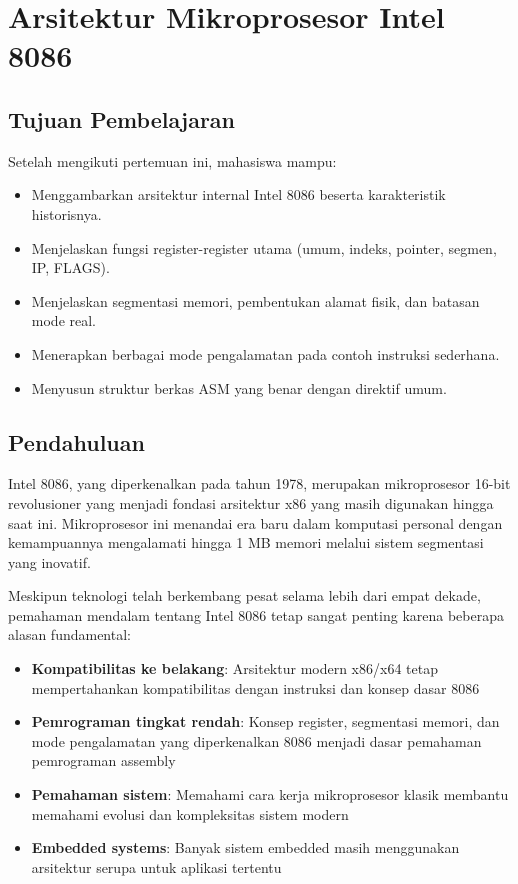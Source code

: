 \documentclass[../main.tex]{subfiles}
\begin{document}
\chapter{Arsitektur Mikroprosesor Intel 8086}

\section{Tujuan Pembelajaran}
Setelah mengikuti pertemuan ini, mahasiswa mampu:
\begin{itemize}
    \item Menggambarkan arsitektur internal Intel 8086 beserta karakteristik historisnya.
    \item Menjelaskan fungsi register-register utama (umum, indeks, pointer, segmen, IP, FLAGS).
    \item Menjelaskan segmentasi memori, pembentukan alamat fisik, dan batasan mode real.
    \item Menerapkan berbagai mode pengalamatan pada contoh instruksi sederhana.
    \item Menyusun struktur berkas ASM yang benar dengan direktif umum.
\end{itemize}

\section{Pendahuluan}
Intel 8086, yang diperkenalkan pada tahun 1978, merupakan mikroprosesor 16-bit revolusioner yang menjadi fondasi arsitektur x86 yang masih digunakan hingga saat ini. Mikroprosesor ini menandai era baru dalam komputasi personal dengan kemampuannya mengalamati hingga 1 MB memori melalui sistem segmentasi yang inovatif. 

Meskipun teknologi telah berkembang pesat selama lebih dari empat dekade, pemahaman mendalam tentang Intel 8086 tetap sangat penting karena beberapa alasan fundamental:

\begin{itemize}
    \item \textbf{Kompatibilitas ke belakang}: Arsitektur modern x86/x64 tetap mempertahankan kompatibilitas dengan instruksi dan konsep dasar 8086
    \item \textbf{Pemrograman tingkat rendah}: Konsep register, segmentasi memori, dan mode pengalamatan yang diperkenalkan 8086 menjadi dasar pemahaman pemrograman assembly
    \item \textbf{Pemahaman sistem}: Memahami cara kerja mikroprosesor klasik membantu memahami evolusi dan kompleksitas sistem modern
    \item \textbf{Embedded systems}: Banyak sistem embedded masih menggunakan arsitektur serupa untuk aplikasi tertentu
\end{itemize}
\end{document}
